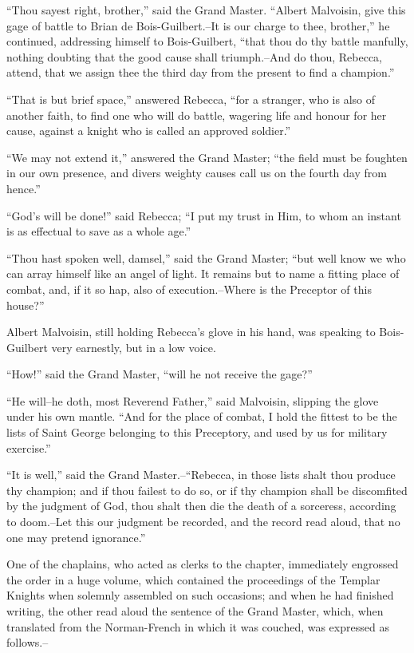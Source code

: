 ``Thou sayest right, brother,'' said the Grand Master. ``Albert
Malvoisin, give this gage of battle to Brian de Bois-Guilbert.--It is
our charge to thee, brother,'' he continued, addressing himself to
Bois-Guilbert, ``that thou do thy battle manfully, nothing doubting that
the good cause shall triumph.--And do thou, Rebecca, attend, that we
assign thee the third day from the present to find a champion.''

``That is but brief space,'' answered Rebecca, ``for a stranger, who is
also of another faith, to find one who will do battle, wagering life and
honour for her cause, against a knight who is called an approved
soldier.''

``We may not extend it,'' answered the Grand Master; ``the field must be
foughten in our own presence, and divers weighty causes call us on the
fourth day from hence.''

``God's will be done!'' said Rebecca; ``I put my trust in Him, to whom
an instant is as effectual to save as a whole age.''

``Thou hast spoken well, damsel,'' said the Grand Master; ``but well
know we who can array himself like an angel of light. It remains but to
name a fitting place of combat, and, if it so hap, also of
execution.--Where is the Preceptor of this house?''

Albert Malvoisin, still holding Rebecca's glove in his hand, was
speaking to Bois-Guilbert very earnestly, but in a low voice.

``How!'' said the Grand Master, ``will he not receive the gage?''

``He will--he doth, most Reverend Father,'' said Malvoisin, slipping the
glove under his own mantle. ``And for the place of combat, I hold the
fittest to be the lists of Saint George belonging to this Preceptory,
and used by us for military exercise.''

``It is well,'' said the Grand Master.--``Rebecca, in those lists shalt
thou produce thy champion; and if thou failest to do so, or if thy
champion shall be discomfited by the judgment of God, thou shalt then
die the death of a sorceress, according to doom.--Let this our judgment
be recorded, and the record read aloud, that no one may pretend
ignorance.''

One of the chaplains, who acted as clerks to the chapter, immediately
engrossed the order in a huge volume, which contained the proceedings of
the Templar Knights when solemnly assembled on such occasions; and when
he had finished writing, the other read aloud the sentence of the Grand
Master, which, when translated from the Norman-French in which it was
couched, was expressed as follows.--

